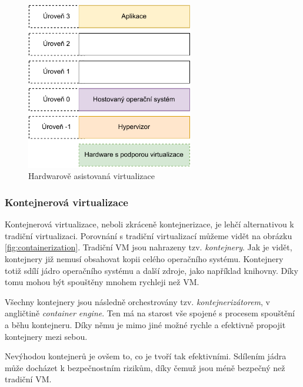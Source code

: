 \begin{figure}[htbp]
    \centering 
    \includegraphics[width=0.65\textwidth]{assets/img/hardware-asssist-virt.pdf}
    \caption{Hardwarově asistovaná virtualizace}
    \label{fig:hardware_asssist_virt}
\end{figure}

\subsubsection{Kontejnerová virtualizace}

Kontejnerová virtualizace, neboli zkráceně kontejnerizace, je lehčí alternativou k tradiční virtualizaci. Porovnání s tradiční virtualizací můžeme vidět na obrázku \ref{fig:containerization}. Tradiční VM jsou nahrazeny tzv. \textit{kontejnery}. Jak je vidět, kontejnery již nemusí obsahovat kopii celého operačního systému. Kontejnery totiž sdílí jádro operačního systému a další zdroje, jako například knihovny. Díky tomu mohou být spouštěny mnohem rychleji než VM. \cite{8693491}

Všechny kontejnery jsou následně orchestrovány tzv. \textit{kontejnerizátorem}, v angličtině \textit{container engine}. Ten má na starost vše spojené s procesem spouštění a běhu kontejneru. Díky němu je mimo jiné možné rychle a efektivně propojit kontejnery mezi sebou.\cite{Bentaleb2021} 

Nevýhodou kontejnerů je ovšem to, co je tvoří tak efektivními. Sdílením jádra může docházet k bezpečnostním rizikům, díky čemuž jsou méně bezpečný než tradiční VM.\cite{6498558}


